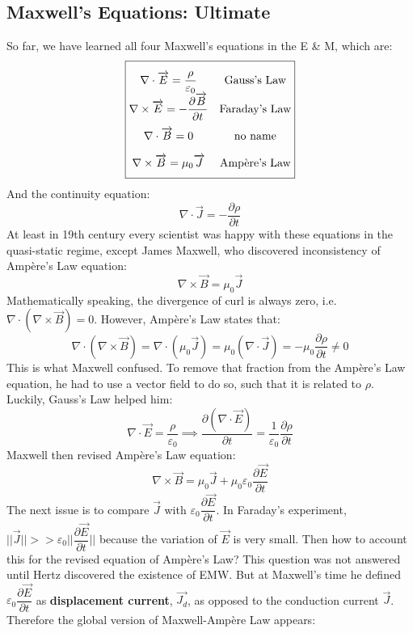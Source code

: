 \documentclass[12pt,a4paper,twoside]{article}
\numberwithin{equation}{section}
\begin{document}
\subsection{Maxwell's Equations: Ultimate}
So far, we have learned all four Maxwell's equations in the E \& M, which are:
\begin{equation}
    \def\arraystretch{2}
    \boxed{\begin{matrix}
        \nabla\cdot \overrightarrow{E} = \dfrac{\rho}{\varepsilon_0} & \text{Gauss's Law}\\ 
        \nabla \times \overrightarrow{E} = -\dfrac{\partial \overrightarrow{B}}{\partial t} & \text{Faraday's Law}\\ 
        \nabla \cdot \overrightarrow{B} = 0 & \text{no name}\\
        \nabla \times \overrightarrow{B} = \mu_0\overrightarrow{J} & \text{Amp\`ere's Law}
    \end{matrix}}
\end{equation}
And the continuity equation:
\begin{equation}
    \nabla \cdot \overrightarrow{J} = -\frac{\partial\rho}{\partial t}
\end{equation}
At least in 19th century every scientist was happy with these equations in the quasi-static regime, except James Maxwell, who discovered inconsistency of Amp\`ere's Law equation:
\[\nabla \times \overrightarrow{B} = \mu_0\overrightarrow{J}\]
Mathematically speaking, the divergence of curl is always zero, i.e. $\nabla\cdot(\nabla \times \overrightarrow{B}) = 0$. However, Amp\`ere's Law states that:
\[\nabla\cdot(\nabla \times \overrightarrow{B}) = \nabla\cdot(\mu_0\overrightarrow{J})=\mu_0(\nabla\cdot\overrightarrow{J})=-\mu_0\frac{\partial \rho}{\partial t}\neq 0\]
This is what Maxwell confused. To remove that fraction from the Amp\`ere's Law equation, he had to use a vector field to do so, such that it is related to $\rho$. Luckily, Gauss's Law helped him:
\[\nabla\cdot \overrightarrow{E}=\frac{\rho}{\varepsilon_0}\implies \frac{\partial(\nabla\cdot \overrightarrow{E})}{\partial t}=\frac{1}{\varepsilon_0}\frac{\partial \rho}{\partial t} \]
Maxwell then revised Amp\`ere's Law equation:
\begin{equation}
    \boxed{
    \nabla\times \overrightarrow{B}=\mu_0\overrightarrow{J}+\mu_0\varepsilon_0\frac{\partial \overrightarrow{E}}{\partial t}
    }
    \label{eq: Ampere-Maxwell-revised}
\end{equation}
The next issue is to compare $\overrightarrow{J}$ with $\varepsilon_0\dfrac{\partial \overrightarrow{E}}{\partial t}$. In Faraday's experiment,$||\overrightarrow{J}||>>\varepsilon_0||\dfrac{\partial \overrightarrow{E}}{\partial t}||$ because the variation of $\overrightarrow{E}$ is very small. Then how to account this for the revised equation of Amp\`ere's Law? This question was not answered until Hertz discovered the existence of EMW. But at Maxwell's time he defined $\varepsilon_0\dfrac{\partial \overrightarrow{E}}{\partial t}$ as \textbf{displacement current}, $\overrightarrow{J_d}$, as opposed to the conduction current $\overrightarrow{J}$. Therefore the global version of Maxwell-Amp\`ere Law appears:
\end{document}
